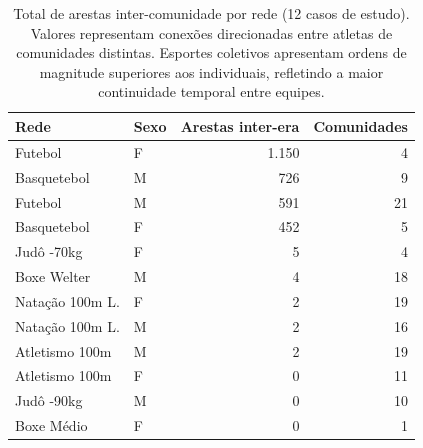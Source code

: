 \begin{table}[htbp]
\centering
\caption{Total de arestas inter-comunidade por rede (12 casos de estudo). Valores representam conexões direcionadas entre atletas de comunidades distintas. Esportes coletivos apresentam ordens de magnitude superiores aos individuais, refletindo a maior continuidade temporal entre equipes.}
\label{tab:top10_rivalries}
\small
\begin{tabular}{llrr}
\toprule
\textbf{Rede} & \textbf{Sexo} & \textbf{Arestas inter-era} & \textbf{Comunidades} \\
\midrule
Futebol          & F & 1.150 & 4  \\
Basquetebol      & M &   726 & 9  \\
Futebol          & M &   591 & 21 \\
Basquetebol      & F &   452 & 5  \\
Judô -70kg       & F &     5 & 4  \\
Boxe Welter      & M &     4 & 18 \\
Natação 100m L.  & F &     2 & 19 \\
Natação 100m L.  & M &     2 & 16 \\
Atletismo 100m   & M &     2 & 19 \\
Atletismo 100m   & F &     0 & 11 \\
Judô -90kg       & M &     0 & 10 \\
Boxe Médio       & F &     0 &  1 \\
\bottomrule
\end{tabular}
\end{table}
